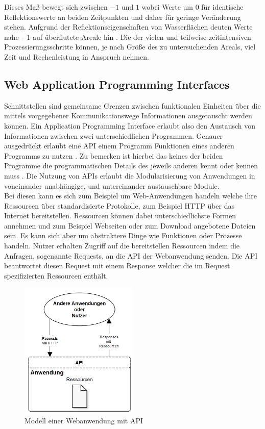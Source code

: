 Dieses Maß bewegt sich zwischen $-1$ und $1$ wobei Werte um $0$ für identische Reflektionswerte an beiden Zeitpunkten und daher für geringe Veränderung stehen. 
Aufgrund der Reflektionseigenschaften von Wasserflächen deuten Werte nahe $-1$ auf überflutete Areale hin \cite{flood_proxy_mapping_ndsi}. 
Die der vielen und teilweise zeitintensiven Prozessierungsschritte können, je nach Größe des zu untersuchenden Areals, viel Zeit und Rechenleistung in Anspruch nehmen.

\subsection{Web Application Programming Interfaces}
Schnittstellen sind gemeinsame Grenzen zwischen funktionalen Einheiten über die mittels vorgegebener Kommunikationswege Informationen ausgetauscht werden können.
Ein Application Programming Interface erlaubt also den Austausch von Informationen zwischen zwei unterschiedlichen Programmen. 
Genauer ausgedrückt erlaubt eine API einem Programm Funktionen eines anderen Programms zu nutzen \cite{geospatial_apis}. Zu bemerken ist hierbei das keines der beiden 
Programme die programmatischen Details des jeweils anderen kennt oder kennen muss \cite{testbed_11}.
Die Nutzung von APIs erlaubt die Modularisierung von Anwendungen in voneinander unabhängige, und untereinander austauschbare Module.\\
Bei diesen kann es sich zum Beispiel um Web-Anwendungen handeln welche ihre Ressourcen über standardisierte Protokolle,
zum Beispiel HTTP über das Internet bereitstellen. Ressourcen können dabei unterschiedlichste Formen annehmen und zum Beispiel Webseiten oder zum Download 
angebotene Dateien sein. Es kann sich aber um abstraktere Dinge wie Funktionen oder Prozesse handeln.
Nutzer erhalten Zugriff auf die bereitstellen Ressourcen indem die Anfragen, sogenannte Requests, an die API
der Webanwendung senden. Die API beantwortet diesen Request mit einem Response welcher die im Request spezifizierten Ressourcen enthält.\\

\begin{figure}[H]
    \centering
    \includegraphics[width=0.5\textwidth]{Bilder/api.png}
    \caption{Modell einer Webanwendung mit API}
    \label{api_model}
\end{figure}

